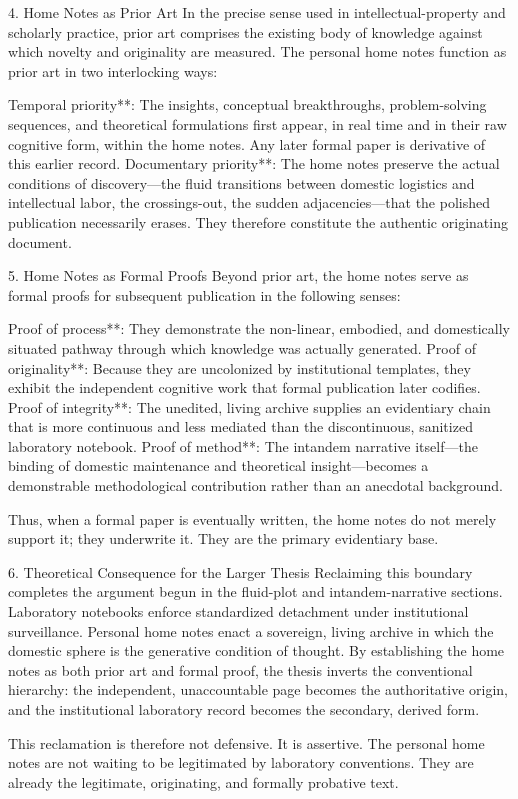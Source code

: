 4. Home Notes as Prior Art
In the precise sense used in intellectual-property and scholarly practice, prior art comprises the existing body of knowledge against which novelty and originality are measured. The personal home notes function as prior art in two interlocking ways:

Temporal priority**: The insights, conceptual breakthroughs, problem-solving sequences, and theoretical formulations first appear, in real time and in their raw cognitive form, within the home notes. Any later formal paper is derivative of this earlier record.
Documentary priority**: The home notes preserve the actual conditions of discovery—the fluid transitions between domestic logistics and intellectual labor, the crossings-out, the sudden adjacencies—that the polished publication necessarily erases. They therefore constitute the authentic originating document.

5. Home Notes as Formal Proofs
Beyond prior art, the home notes serve as formal proofs for subsequent publication in the following senses:

Proof of process**: They demonstrate the non-linear, embodied, and domestically situated pathway through which knowledge was actually generated.  
Proof of originality**: Because they are uncolonized by institutional templates, they exhibit the independent cognitive work that formal publication later codifies.  
Proof of integrity**: The unedited, living archive supplies an evidentiary chain that is more continuous and less mediated than the discontinuous, sanitized laboratory notebook.  
Proof of method**: The intandem narrative itself—the binding of domestic maintenance and theoretical insight—becomes a demonstrable methodological contribution rather than an anecdotal background.

Thus, when a formal paper is eventually written, the home notes do not merely support it; they underwrite it. They are the primary evidentiary base.

6. Theoretical Consequence for the Larger Thesis
Reclaiming this boundary completes the argument begun in the fluid-plot and intandem-narrative sections. Laboratory notebooks enforce standardized detachment under institutional surveillance. Personal home notes enact a sovereign, living archive in which the domestic sphere is the generative condition of thought. By establishing the home notes as both prior art and formal proof, the thesis inverts the conventional hierarchy: the independent, unaccountable page becomes the authoritative origin, and the institutional laboratory record becomes the secondary, derived form.

This reclamation is therefore not defensive. It is assertive. The personal home notes are not waiting to be legitimated by laboratory conventions. They are already the legitimate, originating, and formally probative text.
